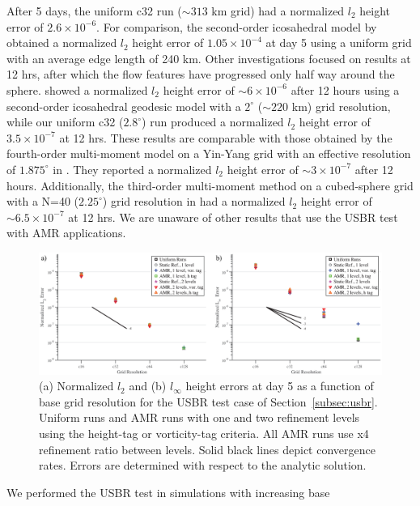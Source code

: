 %
After 5 days, the uniform c32 run ($\sim 313$ km grid) had a
normalized $l_2$ height error of $2.6 \times 10^{-6}$.  For
comparison, the second-order icosahedral model by
\cite{duben2012discontinuous} obtained a normalized $l_2$ height error of 
$1.05 \times 10^{-4}$ at day 5 using a uniform grid with an average edge
length of 240 km.  Other investigations focused on results at 12 hrs,
after which the flow features have progressed only half way around the
sphere.
\cite{pudykiewicz2011numerical} showed a normalized $l_2$ height error
of $\sim 6 \times 10^{-6}$ after 12 hours using a second-order
icosahedral geodesic model with a $2^\circ$ ($\sim 220$ km) grid resolution, while our
uniform c32 ($2.8^\circ$) run produced a normalized $l_2$ height error of 
$3.5 \times 10^{-7}$ at 12 hrs.  These results are comparable with those obtained by
the fourth-order multi-moment model on a Yin-Yang grid with an effective
resolution of $1.875^\circ$ in
\cite{li2015high}. They reported a normalized $l_2$ height error of $\sim 3 \times 10^{-7}$ after 12 hours. Additionally,
the third-order multi-moment method on a cubed-sphere grid with a
N=40 ($2.25^\circ$) grid resolution in
\cite{chen2014global} had a normalized $l_2$ height error of 
$\sim 6.5\times 10^{-7}$ at 12 hrs.  
We are unaware of other results that use the USBR test with AMR
applications.
%
\begin{figure}
    \centerline{%
    \noindent
    \includegraphics[width=\textwidth]{Chap1/final_USBR_errvgrids_combo}}
    \caption{(a) Normalized $l_2$ and (b) $l_\infty$ height errors
    at day 5 as a function of base grid resolution for the USBR test
    case of
Section~\ref{subsec:usbr}.
    Uniform runs and AMR runs with one and two refinement levels
    using the height-tag or vorticity-tag criteria.  All AMR runs use x4
    refinement ratio between levels.  Solid black lines depict
    convergence rates.  Errors are determined with respect to the
    analytic solution.}%
    \label{fig:usbrconvergeplots}
\end{figure}
%
We performed the USBR test in simulations with increasing base
